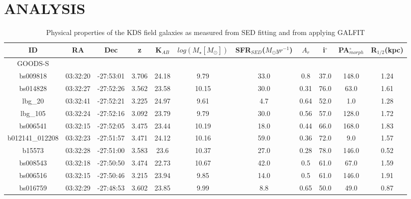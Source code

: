 \documentclass[fleqn,usenatbib]{mn2e}
\begin{document}
\section{ANALYSIS}\label{sec:analysis}

\begin{table*}
\centering
\begin{threeparttable}
\caption{Physical properties of the KDS field galaxies as measured from SED fitting and from applying GALFIT \protect\citep{Peng2010_galfit}}
\label{tab:phys-props}
\begin{tabular}{ccccccccccc}


 \hline
ID              & RA       & Dec       & z     & K$_{AB}$     & $log(M_{\star}[M_{\odot}])$ & SFR$_{SED}$($M_{\odot}yr^{-1}$) & $A_{r}$ & i$^{\circ}$ & PA$_{morph}^{\circ}$ & R$_{1/2}$(kpc) \\
 \hline
 GOODS-S & & & & & & & & & & \\
 \hline
bs009818        & 03:32:20 & -27:53:01 & 3.706        & 24.18  & 9.79  & 33.0 & 0.8         & 37.0        & 148.0   & 1.24      \\
bs014828        & 03:32:27 & -27:52:26 & 3.562        & 23.58  & 10.15 & 30.0 & 0.31        & 76.0        & 63.0    & 1.61      \\
lbg\_20         & 03:32:41 & -27:52:21 & 3.225        & 24.97  & 9.61  & 4.7  & 0.64        & 52.0        & 1.0     & 1.28      \\
lbg\_105        & 03:32:24 & -27:52:16 & 3.092      & 23.79  & 9.79  & 30.0 & 0.56        & 57.0        & 128.0   & 1.72      \\
bs006541        & 03:32:15 & -27:52:05 & 3.475       & 23.44  & 10.19 & 18.0 & 0.44        & 66.0        & 168.0   & 1.83      \\
b012141\_012208 & 03:32:23 & -27:51:57 & 3.471        & 24.12  & 10.16 & 59.0 & 0.36        & 72.0        & 9.0     & 1.57      \\
b15573          & 03:32:28 & -27:51:00 & 3.583        & 23.6   & 10.37 & 27.0 & 0.28        & 78.0        & 146.0   & 0.52      \\
bs008543        & 03:32:18 & -27:50:50 & 3.474        & 22.73  & 10.67 & 42.0 & 0.5         & 61.0        & 67.0    & 1.59      \\
bs006516        & 03:32:15 & -27:50:46 & 3.215        & 23.94  & 9.85  & 14.0 & 0.5         & 61.0        & 146.0   & 1.91      \\
bs016759        & 03:32:29 & -27:48:53 & 3.602       & 23.85  & 9.99  & 8.8  & 0.65        & 50.0        & 49.0    & 0.87      \\

\end{tabular}
\end{threeparttable}
\end{table*}
\end{document}

